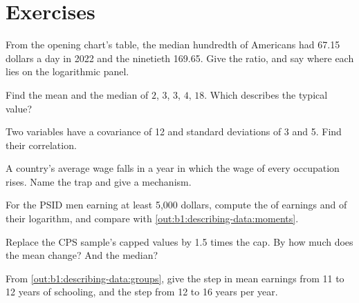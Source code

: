 \label{out:b1:describing-data:trimmed}

\section*{Exercises}\label{sec:b1:describing-data:exercises}

\begin{exercise}[$\star$]\label{exo:b1:describing-data:read}
From the opening chart's table, the median hundredth of Americans had 67.15
dollars a day in 2022 and the ninetieth 169.65. %
Give the ratio, and say where each lies on the logarithmic panel.
\end{exercise}

\begin{exercise}[$\star$]\label{exo:b1:describing-data:five}
Find the mean and the median of $2$, $3$, $3$, $4$, $18$. Which describes the typical value?
\end{exercise}

\begin{exercise}[$\star$]\label{exo:b1:describing-data:r}
Two variables have a covariance of 12 and standard deviations of 3 and 5.
Find their correlation.
\end{exercise}

\begin{exercise}[$\star$]\label{exo:b1:describing-data:trap}
A country's average wage falls in a year in which the wage of every
occupation rises. Name the trap and give a mechanism.
\end{exercise}

\begin{exercise}[$\star\star$]\label{exo:b1:describing-data:log}
For the PSID men earning at least 5,000 dollars, compute the  of
earnings and of their logarithm, and compare with \cref{out:b1:describing-data:moments}.
\end{exercise}

\begin{exercise}[$\star\star$]\label{exo:b1:describing-data:cap}
Replace the CPS sample's capped values by 1.5 times the cap. By how much does
the mean change? And the median?
\end{exercise}

\begin{exercise}[$\star\star$]\label{exo:b1:describing-data:step}
From \cref{out:b1:describing-data:groups}, give the step in mean earnings from 11 to 12
years of schooling, and the step from 12 to 16 years per year.
\end{exercise}

